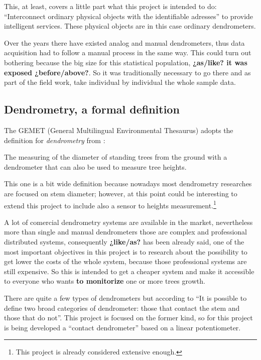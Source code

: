 \documentclass[11pt,a4paper,dvipsnames,twoside]{article}
\newcommand{\lang}[1] {\textbf{\color{Tomato1}#1}}
\begin{document}
This, at least, covers a little part what this project is intended to do: \enquote{Interconnect ordinary physical objects with the identifiable adresses} to provide intelligent services. These physical objects are in this case ordinary dendrometers.

Over the years there have existed analog and manual dendrometers, thus data acquisition had to follow a manual process in the same way. This could turn out bothering because the big size for this statistical population, \lang{¿as/like? it was exposed ¿before/above?}. So it was traditionally necessary to go there and as part of the field work, take individual by individual the whole sample data.


\subsection{Dendrometry, a formal definition}
The GEMET (General Multilingual Environmental Thesaurus) adopts the definition for \textit{dendrometry} from \cite{DictNaturalRes}:

\begin{quoting}
  The measuring of the diameter of standing trees from the ground with a dendrometer that can also be used to measure tree heights.
\end{quoting}

This one is a bit wide definition because nowadays most dendrometry researches are focused on stem diameter; however, at this point could be interesting to extend this project to include also a sensor to heights measurement.\footnote{This project is already considered extensive enough.} 

A lot of comercial dendrometry systems are available in the market, nevertheless more than single and manual dendrometers those are complex and professional distributed systems, consequently \lang{¿like/as?} has been already said, one of the most important objectives in this project is to research about the possibility to get lower the costs of the whole system, because those professional systems are still expensive. So this is intended to get a cheaper system and make it accessible to everyone who wants \lang{to monitorize} one or more trees growth. 

There are quite a few types of dendrometers but according to \cite{DendroResearch} \enquote{It is possible to define two broad categories of dendrometer: those that contact the stem and those that do not}. This project is focused on the former kind, so for this project is being developed a \enquote{contact dendrometer} based on a linear potentiometer.
\end{document}

